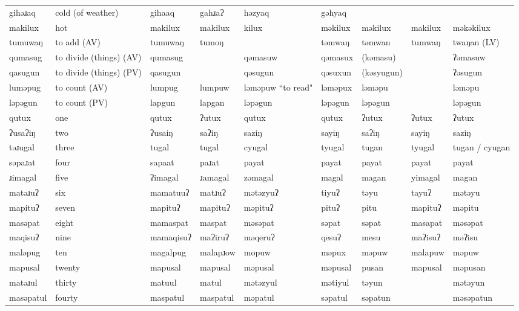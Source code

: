 \begin{landscape}
\begin{longtable}{*{9}{>{\raggedright\arraybackslash}p{}}}
\text{*}gihəɹaq & cold (of weather) & gihaaq & gahɹaʔ & həzyaq & gəhyaq &  &  & \\
\text{*}makilux & hot & makilux & makilux & kilux & məkilux & məkilux & makilux & məkəkilux\\
\text{*}tumuwaŋ & to add (AV) & tumuwaŋ & tumoŋ &  & təmwaŋ & təmwan & tumwaŋ & twaŋan (LV)\\
\text{*}qumasug & to divide (things) (AV) & qumasug &  & qəmasuw & qəmasux & (kəmasu) &  & ʔəmasuw\\
\text{*}qasugun & to divide (things) (PV) & qasugun &  & qəsugun & qəsuxun & (kəsyugun) &  & ʔəsugun\\
\text{*}luməpug & to count (AV) & lumpug & lumpuw & ləməpuw \newline ``to read" & ləməpux & ləməpu &  & ləməpu\\
\text{*}ləpəgun & to count (PV) & lapgun & lapgan & ləpəgun & ləpəgun & ləpəgun &  & ləpəgun\\
\text{*}qutux & one & qutux & ʔutux & qutux & qutux & ʔutux & ʔutux & ʔutux\\
\text{*}ʔusaʔiŋ & two & ʔusaiŋ & saʔiŋ & saziŋ & sayiŋ & saʔiŋ & sayiŋ & saziŋ\\
\text{*}təɹugal & three & tugal & tugal & cyugal & tyugal & tugan & tyugal & tugan / cyugan\\
\text{*}səpaɹat & four & sapaat & paɹat & payat & payat & payat & payat & payat\\
\text{*}ɹimagal & five & ʔimagal & ɹamagal & zəmagal & magal & magan & yimagal & magan\\
\text{*}matəɹuʔ & six & mamatuuʔ & matɹuʔ & mətəzyuʔ & tiyuʔ & təyu & tayuʔ & mətəyu\\
\text{*}mapituʔ & seven & mapituʔ & mapituʔ & məpituʔ & pituʔ & pitu & mapituʔ & məpitu\\
\text{*}masəpat & eight & mamaspat & maspat & məsəpat & səpat & səpat & masapat & məsəpat\\
\text{*}maqisuʔ & nine & mamaqisuʔ & maʔiruʔ & məqeruʔ & qesuʔ & mesu & maʔisuʔ & məʔisu\\
\text{*}maləpug & ten & magalpug & malapɹow & mopuw & məpux & məpuw & malapuw & məpuw\\
\text{*}mapusal & twenty & mapusal & mapusal & məpusal & məpusal & pusan & mapusal & məpusan\\
\text{*}matəɹul & thirty & matuul & matul & mətəzyul & mətiyul & təyun &  & mətəyun\\
\text{*}masəpatul & fourty & maspatul & maspatul & məpatul & səpatul & səpatun &  & məsəpatun\\

\end{longtable}
\end{landscape}
